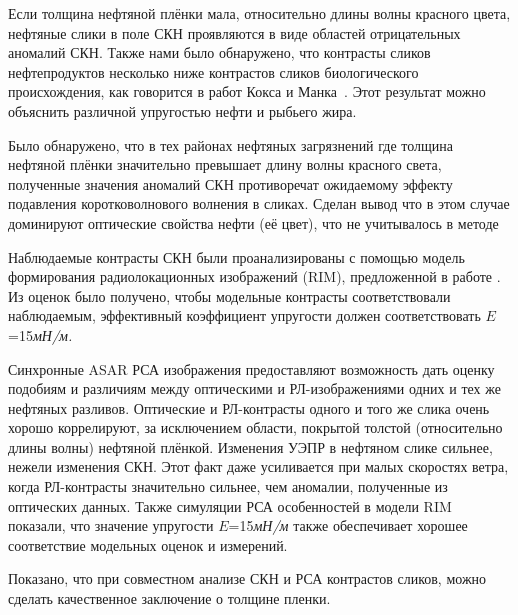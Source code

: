 Если толщина нефтяной плёнки мала, относительно длины волны красного цвета, нефтяные слики в поле СКН проявляются в виде  областей отрицательных аномалий СКН. Также нами было обнаружено, что контрасты сликов нефтепродуктов несколько ниже контрастов сликов биологического происхождения, как говорится в работ Кокса и Манка~\citep{Cox1954, Cox1954a, Cox1956}. Этот результат можно объяснить различной упругостью нефти и рыбьего жира.

Было обнаружено, что в тех районах нефтяных загрязнений где толщина нефтяной плёнки значительно превышает длину волны красного света, полученные значения аномалий СКН противоречат ожидаемому эффекту подавления коротковолнового волнения в сликах. Сделан вывод что в этом случае доминируют оптические свойства нефти (её цвет), что не учитывалось в методе

Наблюдаемые контрасты СКН были проанализированы с помощью модель формирования радиолокационных изображений (RIM), предложенной в работе  \citep{Kudryavtsev2005, 2008}. Из оценок было получено, чтобы модельные контрасты соответствовали наблюдаемым, эффективный коэффициент упругости должен соответствовать $E$=15\textit{мН/м.}

Синхронные ASAR РСА изображения предоставляют возможность дать оценку подобиям и различиям между оптическими и РЛ-изображениями одних и тех же нефтяных разливов. Оптические и РЛ-контрасты одного и того же слика очень хорошо коррелируют, за исключением области, покрытой толстой (относительно длины волны) нефтяной плёнкой. Изменения УЭПР в нефтяном слике сильнее, нежели изменения СКН. Этот факт даже усиливается при малых скоростях ветра, когда РЛ-контрасты значительно сильнее, чем аномалии, полученные из оптических данных. Также симуляции РСА особенностей в модели RIM показали, что значение упругости $E$=15\textit{мН/м }также обеспечивает хорошее соответствие модельных оценок и измерений.

Показано, что при совместном анализе СКН и РСА контрастов сликов, можно сделать качественное заключение о толщине пленки.




\clearpage